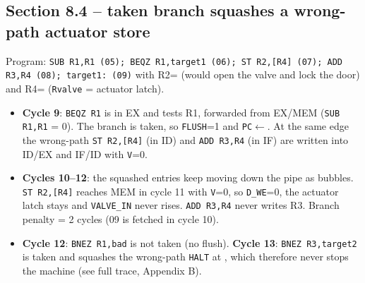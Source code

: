 \documentclass[10pt,a4paper]{article}
\begin{document}
\begin{landscape}
\section{Section 8.4 -- taken branch squashes a wrong-path actuator store}
Program: \texttt{SUB R1,R1 (05); BEQZ R1,target1 (06); ST R2,[R4] (07); ADD R3,R4 (08); target1: (09)}
with R2= (would open the valve and lock the door) and R4= (\texttt{Rvalve} = actuator latch).
\begin{tracetab}

\end{tracetab}
\vspace{-4mm}
\begin{itemize}
\item \textbf{Cycle 9}: \texttt{BEQZ R1} is in EX and tests R1, forwarded from EX/MEM (\texttt{SUB R1,R1} = 0). The branch is
  taken, so \texttt{FLUSH}=1 and \texttt{PC}$\leftarrow$. At the same edge the wrong-path \texttt{ST R2,[R4]} (in ID)
  and \texttt{ADD R3,R4} (in IF) are written into ID/EX and IF/ID with \texttt{V}=0.
\item \textbf{Cycles 10--12}: the squashed entries keep moving down the pipe as bubbles. \texttt{ST R2,[R4]} reaches MEM in
  cycle 11 with \texttt{V}=0, so \texttt{D\_WE}=0, the actuator latch stays  and \texttt{VALVE\_IN} never rises.
  \texttt{ADD R3,R4} never writes R3. Branch penalty = 2 cycles (09 is fetched in cycle 10).
\item \textbf{Cycle 12}: \texttt{BNEZ R1,bad} is not taken (no flush). \textbf{Cycle 13}: \texttt{BNEZ R3,target2} is taken
  and squashes the wrong-path \texttt{HALT} at , which therefore never stops the machine (see full trace, Appendix B).
\end{itemize}

\end{landscape}
\end{document}
